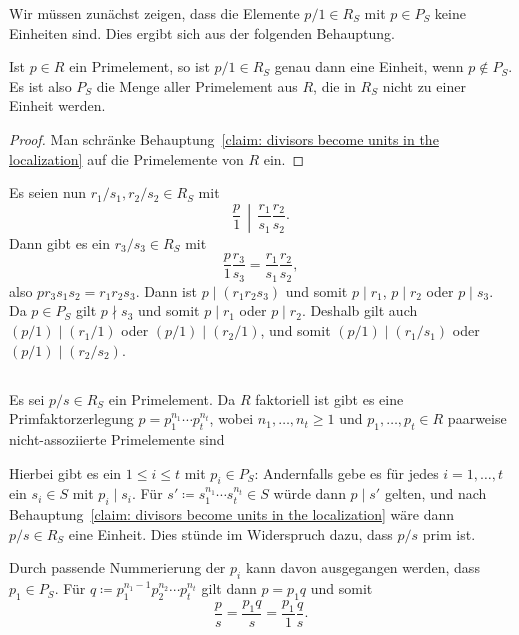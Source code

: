 \documentclass[a4paper,10pt,numbers=noenddot]{scrartcl}
\begin{document}
Wir müssen zunächst zeigen, dass die Elemente $p/1 \in R_S$ mit $p \in P_S$ keine Einheiten sind.
Dies ergibt sich aus der folgenden Behauptung.

\begin{claim}
  \label{claim: prime elements which become units in the localization}
  Ist $p \in R$ ein Primelement, so ist $p/1 \in R_S$ genau dann eine Einheit, wenn $p \notin P_S$.
  Es ist also $P_S$ die Menge aller Primelement aus $R$, die in $R_S$ nicht zu einer Einheit werden.
\end{claim}

\begin{proof}
  Man schränke Behauptung~\ref{claim: divisors become units in the localization} auf die Primelemente von $R$ ein.
\end{proof}

Es seien nun $r_1/s_1, r_2/s_2 \in R_S$ mit
\[
  \left. \frac{p}{1} \,\middle|\, \frac{r_1}{s_1} \frac{r_2}{s_2} \right..
\]
Dann gibt es ein $r_3/s_3 \in R_S$ mit
\[
    \frac{p}{1} \frac{r_3}{s_3}
  = \frac{r_1}{s_1} \frac{r_2}{s_2},
\]
also $p r_3 s_1 s_2 = r_1 r_2 s_3$.
Dann ist $p \mid (r_1 r_2 s_3)$ und somit $p \mid r_1$, $p \mid r_2$ oder $p \mid s_3$.
Da $p \in P_S$ gilt $p \nmid s_3$ und somit $p \mid r_1$ oder $p \mid r_2$.
Deshalb gilt auch $(p/1) \mid (r_1/1)$ oder $(p/1) \mid (r_2/1)$, und somit $(p/1) \mid (r_1/s_1)$ oder $(p/1) \mid (r_2/s_2)$.





\subsection{}
\label{subsec: every prime element in the localization is associated to one in the ground ring}

Es sei $p/s \in R_S$ ein Primelement.
Da $R$ faktoriell ist gibt es eine Primfaktorzerlegung $p  = p_1^{n_1} \dotsm p_t^{n_t}$, wobei $n_1, \dotsc, n_t \geq 1$ und $p_1, \dotsc, p_t \in R$ paarweise nicht-assoziierte Primelemente sind

Hierbei gibt es ein $1 \leq i \leq t$ mit $p_i \in P_S$:
Andernfalls gebe es für jedes $i = 1, \dotsc, t$ ein $s_i \in S$ mit $p_i \mid s_i$.
Für $s' \coloneqq s_1^{n_1} \dotsm s_t^{n_t} \in S$ würde dann $p \mid s'$ gelten, und nach Behauptung~\ref{claim: divisors become units in the localization} wäre dann $p/s \in R_S$ eine Einheit.
Dies stünde im Widerspruch dazu, dass $p/s$ prim ist.

Durch passende Nummerierung der $p_i$ kann davon ausgegangen werden, dass $p_1 \in P_S$.
Für $q \coloneqq p_1^{n_1-1} p_2^{n_2} \dotsm p_t^{n_t}$ gilt dann $p = p_1 q$ und somit
\begin{equation}
  \label{eqn: association}
    \frac{p}{s}
  = \frac{p_1 q}{s}
  = \frac{p_1}{1} \frac{q}{s}.
\end{equation}
\end{document}
